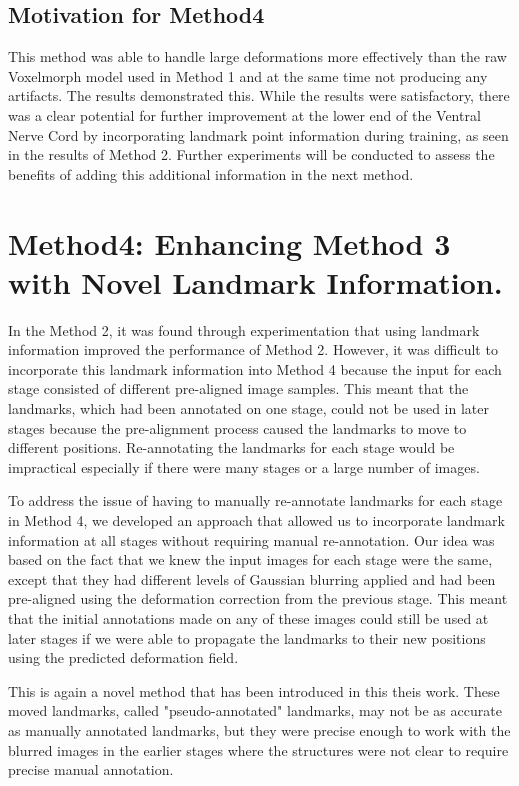 \documentclass{report}
\begin{document}
	\subsection{Motivation for Method4}
	This method was able to handle large deformations more effectively than the raw Voxelmorph model used in Method 1 and at the same time not producing any artifacts. The results demonstrated this. While the results were satisfactory, there was a clear potential for further improvement at the lower end of the Ventral Nerve Cord by incorporating landmark point information during training, as seen in the results of Method 2. Further experiments will be conducted to assess the benefits of adding this additional information in the next method.
	
	\section{Method4: Enhancing Method 3 with Novel Landmark Information.}
	In the Method 2, it was found through experimentation that using landmark information improved the performance of Method 2. However, it was difficult to incorporate this landmark information into Method 4 because the input for each stage consisted of different pre-aligned image samples. This meant that the landmarks, which had been annotated on one stage, could not be used in later stages because the pre-alignment process caused the landmarks to move to different positions. Re-annotating the landmarks for each stage would be impractical especially if there were many stages or a large number of images.
	
	To address the issue of having to manually re-annotate landmarks for each stage in Method 4, we developed an approach that allowed us to incorporate landmark information at all stages without requiring manual re-annotation. Our idea was based on the fact that we knew the input images for each stage were the same, except that they had different levels of Gaussian blurring applied and had been pre-aligned using the deformation correction from the previous stage. This meant that the initial annotations made on any of these images could still be used at later stages if we were able to propagate the landmarks to their new positions using the predicted deformation field.
	
	This is again a novel method that has been introduced in this theis work. These moved landmarks, called "pseudo-annotated" landmarks, may not be as accurate as manually annotated landmarks, but they were precise enough to work with the blurred images in the earlier stages where the structures were not clear to require precise manual annotation.
	
\end{document}
